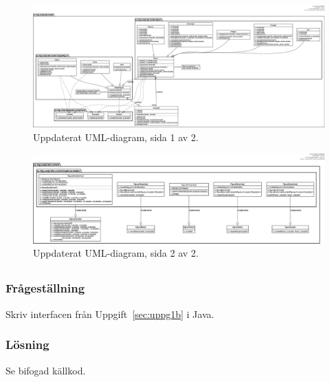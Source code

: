 \begin{figure}
\centering
\includegraphics[width=\linewidth]{diagram/lab2-uppgift1-001.eps}
\caption{Uppdaterat UML-diagram, sida 1 av 2.
}
\label{fig:uppg1b1}
\end{figure}

\begin{figure}
\centering
\includegraphics[width=\linewidth]{diagram/lab2-uppgift1-002.eps}
\caption{Uppdaterat UML-diagram, sida 2 av 2.
}
\label{fig:uppg1b2}
\end{figure}


\subsection{}\label{sec:uppg1c}
\subsubsection*{Frågeställning}
Skriv interfacen från Uppgift~\ref{sec:uppg1b} i Java.

\subsubsection*{Lösning}
Se bifogad källkod.


